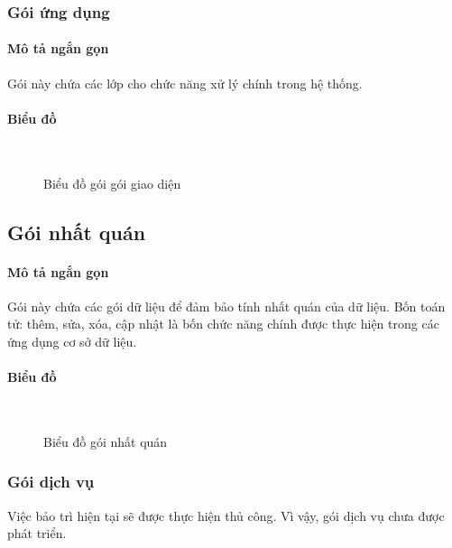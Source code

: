 \documentclass[./../main_file.tex]{subfiles}
\begin{document}
	\subsubsection{Gói ứng dụng}
	\paragraph{Mô tả ngắn gọn}
	Gói này chứa các lớp cho chức năng xử lý chính trong hệ thống.
	\paragraph{Biểu đồ}~\\
	\begin{figure}[H]
		\centering
		\resizebox{1.0\textwidth}{!}{}
		\caption{Biểu đồ gói gói giao diện}
	\end{figure}
	\subsection{Gói nhất quán}
	\paragraph{Mô tả ngắn gọn}
	Gói này chứa các gói dữ liệu để đảm bảo tính nhất quán của dữ liệu. Bốn toán tử: thêm, sửa, xóa, cập nhật là bốn chức năng chính được thực hiện trong các ứng dụng cơ sở dữ liệu.
	\paragraph{Biểu đồ}~\\
		\begin{figure}[H]
		\centering
		\resizebox{0.8\textwidth}{!}{}
		\caption{Biểu đồ gói nhất quán}
	\end{figure}
	\subsubsection{Gói dịch vụ}
	Việc bảo trì hiện tại sẽ được thực hiện thủ công. Vì vậy, gói dịch vụ chưa được phát triển.
	
\end{document}
